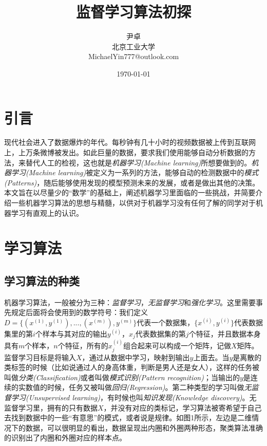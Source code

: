 \documentclass[UTF8, 12pt]{ctexart}
\begin{document}
\title{\heiti 监督学习算法初探}
\author{\kaishu 尹卓\\北京工业大学\\MichaelYin777@outlook.com\\}
\date{\today}
\maketitle

\tableofcontents
\newpage

\section{引言}
现代社会进入了数据爆炸的年代。每秒钟有几十小时的视频数据被上传到互联网上，上万条微博被发出。如此巨量的数据，要求我们使用能够自动分析数据的方法，来替代人工的检视，这也就是\emph{机器学习(Machine learning)}所想要做到的。\emph{机器学习(Machine learning)}被定义为一系列的方法，能够自动的检测数据中的\emph{模式(Patterns)}，随后能够使用发现的模型预测未来的发展，或者是做出其他的决策\cite{robert2014machine}。本文旨在以尽量少的“数学”的基础上，阐述机器学习里面临的一些挑战，并简要介绍一些机器学习算法的思想与精髓，以供对于机器学习没有任何了解的同学对于机器学习有直观上的认识。

\section{学习算法}
\subsection{学习算法的种类}
机器学习算法，一般被分为三种：\emph{监督学习}，\emph{无监督学习}和\emph{强化学习}。这里需要事先规定后面将会使用到的数学符号：我们定义$D=\{(x^{(1)}, y^{(1)}),...,(x^{(m)}), y^{(m)}\}$代表一个数据集，$\{x^{(i)},y^{(i)}\}$代表数据集里的第$i$个样本与其对应的输出$y^{(i)}$，$x_{j}$代表数据集的第$j$个特征，并且数据本身具有$m$个样本，$n$个特征，所有的$x_{j}^{(i)}$组合起来可以构成一个矩阵，记做$X$矩阵。监督学习目标是将输入$X$，通过从数据中学习，映射到输出$y$上面去。当$y$是离散的类标签的时候（比如说通过人的身高体重，判断是男人还是女人），这样的任务被叫做\emph{分类(Classification)}或者叫做\emph{模式识别(Pattern recognition)}；当输出的$y$是连续的实数值的时候，任务又被叫做\emph{回归(Regression)}。第二种类型的学习叫做\emph{无监督学习(Unsupervised learning)}，有时候也叫\emph{知识发现(Knowledge discovery)}。无监督学习里，拥有的只有数据$X$，并没有对应的类标记，学习算法被寄希望于自己去找到数据中的一些“有意思”的模式，或者说是规律。如图1所示，左边是二维情况下的数据，可以很明显的看出，数据呈现出内圈和外圈两种形态，聚类算法准确的识别出了内圈和外圈对应的样本点。
\end{document}
